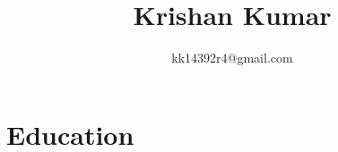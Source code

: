 \documentclass[10pt]{article}
\title{\bfseries\Huge Krishan Kumar}
\author{kk14392r4@gmail.com}
\date{}
\begin{document}
\begin{minipage}{0.65\textwidth}
\begingroup
\let\center\flushleft
\let\endcenter\endflushleft
\maketitle
\endgroup
\end{minipage}
\begin{minipage}{0.3\textwidth}
\flushright{\rule{3.5cm}{4.5cm}}
\end{minipage}
\section*{Education}
\end{document}
